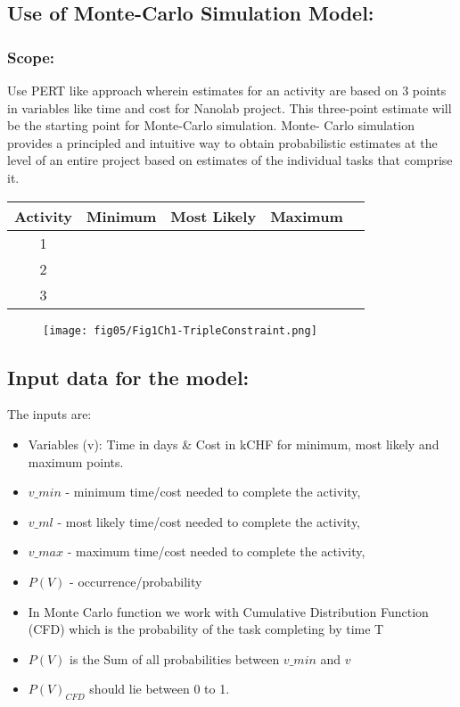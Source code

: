\subsection{Use of Monte-Carlo Simulation Model:}

\subsubsection*{Scope:}
Use PERT like approach wherein estimates for an activity are based on 3 points in variables like time and cost for Nanolab project. This three-point estimate will be the starting point for Monte-Carlo simulation. Monte- Carlo simulation provides a principled and intuitive way to obtain probabilistic estimates at the level of an entire project based on estimates of the individual tasks that comprise it.



\begin{center}
	\begin{tabular}{ |c|c|c|c| c|} 
		\hline
		Activity & Minimum & Most Likely & Maximum\\
		\hline
		1 & &  & \\ 
			\hline
		2 & & &\\ 
			\hline
		3& & &\\ 
		\hline
	\end{tabular}
\end{center}

\begin{figure}
	\centering
	\texttt{[image: fig05/Fig1Ch1-TripleConstraint.png]}
\end{figure}

\subsection{Input data for the model:} 
	
The inputs are:
\begin{itemize}
	\item Variables (v): Time in days \& Cost in kCHF for minimum, most likely and maximum points.
	\item $v\_min$ - minimum time/cost needed to complete the activity,
	\item $v\_ml$ - most likely time/cost needed to complete the activity,
	\item $v\_max$ - maximum time/cost needed to complete the activity, 
	\item $P(V)$ - occurrence/probability
	\item In Monte Carlo function we work with Cumulative Distribution Function (CFD) which is the probability of the task completing by time T
	\item $P(V)$ is the Sum of all probabilities between $v\_min$ and $v$
	\item $P(V)_{CFD}$ should lie between 0 to 1.
\end{itemize}
     

